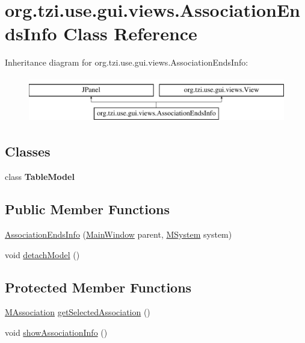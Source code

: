 \hypertarget{classorg_1_1tzi_1_1use_1_1gui_1_1views_1_1_association_ends_info}{\section{org.\-tzi.\-use.\-gui.\-views.\-Association\-Ends\-Info Class Reference}
\label{classorg_1_1tzi_1_1use_1_1gui_1_1views_1_1_association_ends_info}
}
Inheritance diagram for org.\-tzi.\-use.\-gui.\-views.\-Association\-Ends\-Info\-:\begin{figure}[H]
\begin{center}
\leavevmode
\includegraphics[height=2.000000cm]{classorg_1_1tzi_1_1use_1_1gui_1_1views_1_1_association_ends_info}
\end{center}
\end{figure}
\subsection*{Classes}
\begin{DoxyCompactItemize}
\item 
class {\bfseries Table\-Model}
\end{DoxyCompactItemize}
\subsection*{Public Member Functions}
\begin{DoxyCompactItemize}
\item 
\hyperlink{classorg_1_1tzi_1_1use_1_1gui_1_1views_1_1_association_ends_info_a55039cfc3044991cd3ede65aefa2d618}{Association\-Ends\-Info} (\hyperlink{classorg_1_1tzi_1_1use_1_1gui_1_1main_1_1_main_window}{Main\-Window} parent, \hyperlink{classorg_1_1tzi_1_1use_1_1uml_1_1sys_1_1_m_system}{M\-System} system)
\item 
void \hyperlink{classorg_1_1tzi_1_1use_1_1gui_1_1views_1_1_association_ends_info_a23480b836c85fc77fb160af438377194}{detach\-Model} ()
\end{DoxyCompactItemize}
\subsection*{Protected Member Functions}
\begin{DoxyCompactItemize}
\item 
\hyperlink{interfaceorg_1_1tzi_1_1use_1_1uml_1_1mm_1_1_m_association}{M\-Association} \hyperlink{classorg_1_1tzi_1_1use_1_1gui_1_1views_1_1_association_ends_info_abe05a6eae78c842e056b5cde1956c53e}{get\-Selected\-Association} ()
\item 
void \hyperlink{classorg_1_1tzi_1_1use_1_1gui_1_1views_1_1_association_ends_info_a3f817b742512f2ed14fdbeb248af5d06}{show\-Association\-Info} ()
\end{DoxyCompactItemize}


